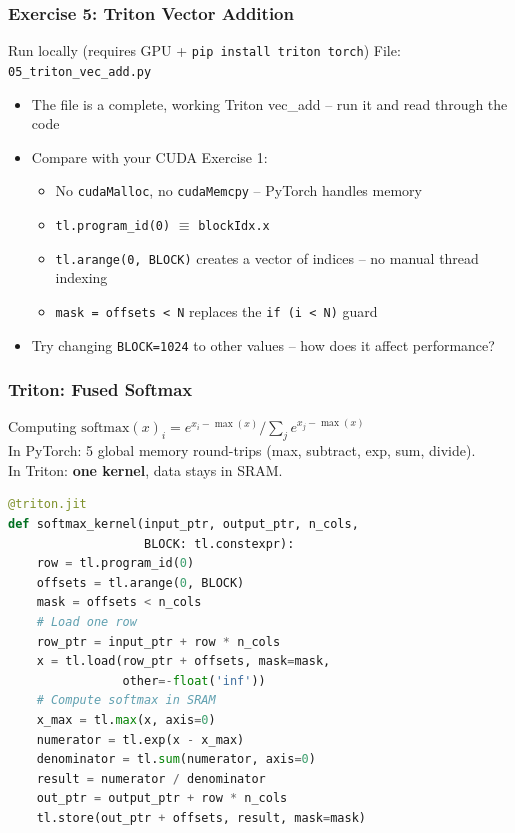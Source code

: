 \documentclass[aspectratio=169]{beamer}
\begin{document}
\begin{frame}
	\frametitle{Exercise 5: Triton Vector Addition}
	\begin{block}{Run locally (requires GPU + \texttt{pip install triton torch})}
		File: \texttt{05\_triton\_vec\_add.py}
	\end{block}
	\vspace{0.5em}
	\begin{itemize}
		\item The file is a complete, working Triton vec\_add -- run it and read through the code
		\item Compare with your CUDA Exercise 1:
		      \begin{itemize}
			      \item No \texttt{cudaMalloc}, no \texttt{cudaMemcpy} -- PyTorch handles memory
			      \item \texttt{tl.program\_id(0)} $\equiv$ \texttt{blockIdx.x}
			      \item \texttt{tl.arange(0, BLOCK)} creates a vector of indices -- no manual thread indexing
			      \item \texttt{mask = offsets < N} replaces the \texttt{if (i < N)} guard
		      \end{itemize}
		\item Try changing \texttt{BLOCK=1024} to other values -- how does it affect performance?
	\end{itemize}
\end{frame}

\begin{frame}[fragile]
	\frametitle{Triton: Fused Softmax}
	Computing $\text{softmax}(x)_i = e^{x_i - \max(x)} / \sum_j e^{x_j - \max(x)}$ \\[0.5em]
	In PyTorch: 5 global memory round-trips (max, subtract, exp, sum, divide). \\
	In Triton: \textbf{one kernel}, data stays in SRAM.
	\begin{lstlisting}[language=Python]
@triton.jit
def softmax_kernel(input_ptr, output_ptr, n_cols,
                   BLOCK: tl.constexpr):
    row = tl.program_id(0)
    offsets = tl.arange(0, BLOCK)
    mask = offsets < n_cols
    # Load one row
    row_ptr = input_ptr + row * n_cols
    x = tl.load(row_ptr + offsets, mask=mask,
                other=-float('inf'))
    # Compute softmax in SRAM
    x_max = tl.max(x, axis=0)
    numerator = tl.exp(x - x_max)
    denominator = tl.sum(numerator, axis=0)
    result = numerator / denominator
    out_ptr = output_ptr + row * n_cols
    tl.store(out_ptr + offsets, result, mask=mask)
	\end{lstlisting}
\end{frame}
\end{document}
